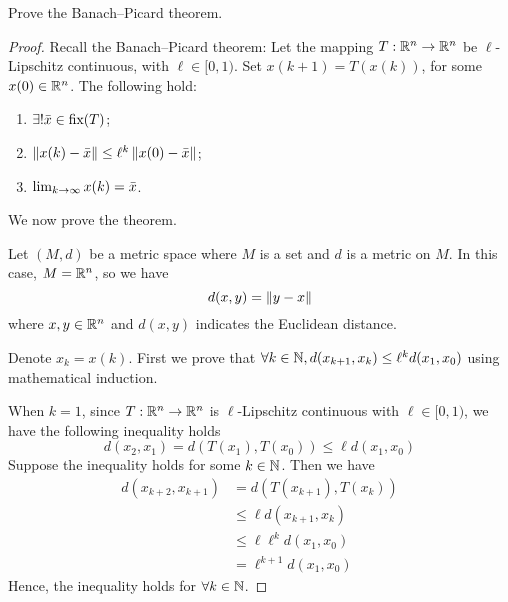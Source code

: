 \documentclass[a4 paper, 12pt]{article}
\begin{document}
 Prove the Banach–Picard theorem.
\vspace{-1em}
\begin{proof}
Recall the Banach–Picard theorem: Let the mapping $T: \mathbb{R}^n \rightarrow \mathbb{R}^n$ be $\ell$-Lipschitz continuous, with $\ell \in [0,1)$. Set $x(k+1) = T(x(k))$, for some $x(0) \in \mathbb{R}^n$. The following hold:
\vspace{-1em}
\begin{enumerate}[label = {\roman{enumi})}]
        \item $\exists ! \bar{x} \in \textnormal{fix}(T)$;
        \item $\left\|x(k) - \bar{x}\right\| \leq \ell^k \left\|x(0) - \bar{x}\right\|$;
        \item $\lim_{k\rightarrow\infty}x(k) = \bar{x}$.
\end{enumerate}
\vspace{-1em}
We now prove the theorem.

Let $(M,d)$ be a metric space where $M$ is a set and $d$ is a metric on $M$. In this case, $M=\mathbb{R}^n$, so we have
\begin{equation}
        d(x,y) = \left\|y-x\right\|
\end{equation}
where $x,y \in \mathbb{R}^n$ and $d(x,y)$ indicates the Euclidean distance.

Denote $x_k = x(k)$. First we prove that $\forall k\in\mathbb{N}, d(x_{k+1}, x_k) \leq \ell^kd(x_1,x_0)$ using mathematical induction.

When $k=1$, since $T: \mathbb{R}^n \rightarrow \mathbb{R}^n$ is $\ell$-Lipschitz continuous with $\ell \in [0,1)$, we have the following inequality holds
\begin{equation}
        d(x_2,x_1) = d(T(x_1),T(x_0)) \leq \ell d(x_1,x_0)
\end{equation}
Suppose the inequality holds for some $k\in\mathbb{N}$. Then we have 
\begin{equation}
        \begin{aligned}
                d(x_{k+2},x_{k+1}) &= d(T(x_{k+1}), T(x_k)) \\ 
                &\leq \ell d(x_{k+1},x_k) \\
                &\leq \ell\ell^k d(x_1,x_0) \\ 
                &= \ell^{k+1} d(x_1,x_0)
        \end{aligned}
\end{equation}
Hence, the inequality holds for $\forall k \in \mathbb{N}$. 


\end{proof}
\end{document}
